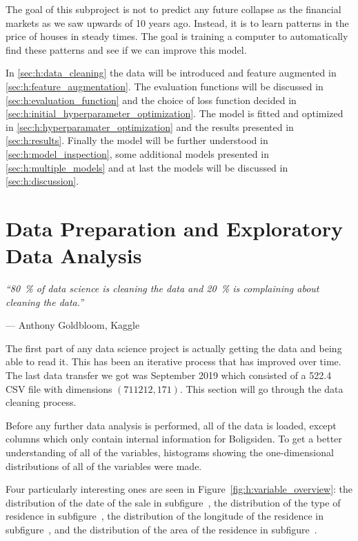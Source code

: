 The goal of this subproject is not to predict any future collapse as the financial markets as we saw upwards of 10 years ago. Instead, it is to learn patterns in the price of houses in steady times. The goal is training a computer to automatically find these patterns and see if we can improve this model.

In \autoref{sec:h:data_cleaning} the data will be introduced and feature augmented in \autoref{sec:h:feature_augmentation}.  The evaluation functions will be discussed in \autoref{sec:h:evaluation_function} and the choice of loss function decided in \autoref{sec:h:initial_hyperparameter_optimization}. The model is fitted and optimized in \autoref{sec:h:hyperparamater_optimization} and the results presented in \autoref{sec:h:results}. Finally the model will be further understood in \autoref{sec:h:model_inspection}, some additional models presented in \autoref{sec:h:multiple_models} and at last the models will be discussed in \autoref{sec:h:discussion}.

\section{Data Preparation and Exploratory Data Analysis}
\label{sec:h:data_cleaning}
\epigraph{\textit{``\SI{80}{\percent} of data science is cleaning the data and \SI{20}{\percent} is complaining about cleaning the data.''}}{--- Anthony Goldbloom, Kaggle}


The first part of any data science project is actually getting the data and being able to read it. This has been an iterative process that has improved over time. The last data transfer we got was September  2019 which consisted of a \SI{522.4}{\mega\byte} CSV file with dimensions $(\num{711212}, \num{171})$. This section will go through the data cleaning process.

Before any further data analysis is performed, all of the data is loaded, except columns which only contain internal information for Boligsiden. To get a better understanding of all of the variables, histograms showing the one-dimensional distributions of all of the variables were made.

Four particularly interesting ones are seen in Figure~\ref{fig:h:variable_overview}: 
the distribution of the date of the sale  in subfigure~,  
the distribution of the type of residence  in subfigure~,
the distribution of the longitude of the residence  in subfigure~, and
the distribution of the area of the residence  in subfigure~.

